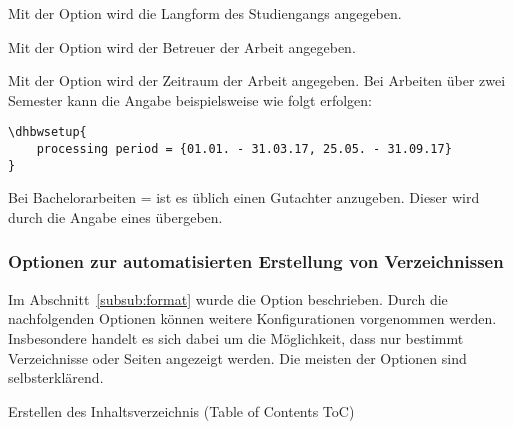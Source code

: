 \documentclass[babel=ngerman,highlight=false]{skdoc}
\begin{document}
                Mit der Option wird die Langform des Studiengangs angegeben.\medskip
    
                Mit der Option wird der Betreuer der Arbeit angegeben.\medskip
    
                Mit der Option wird der Zeitraum der Arbeit angegeben. Bei Arbeiten über zwei Semester kann die Angabe beispielsweise wie folgt erfolgen:
                \begin{verbatim}
\dhbwsetup{
    processing period = {01.01. - 31.03.17, 25.05. - 31.09.17}
}
                \end{verbatim}
                \medskip
                
                Bei Bachelorarbeiten = ist es üblich einen Gutachter anzugeben. Dieser wird durch die Angabe eines  übergeben.
                
            \subsubsection{Optionen zur automatisierten Erstellung von Verzeichnissen}\label{subsub:options-tocs}
                Im Abschnitt~\ref{subsub:format} wurde die Option  beschrieben. Durch die nachfolgenden Optionen können weitere Konfigurationen vorgenommen werden. Insbesondere handelt es sich dabei um die Möglichkeit, dass nur bestimmt Verzeichnisse oder Seiten angezeigt werden. Die meisten der Optionen sind selbsterklärend.\medskip
            
                \medskip
                
                \medskip
                
                \medskip
                
                Erstellen des Inhaltsverzeichnis (Table of Contents ToC)
                \medskip
                
\end{document}
